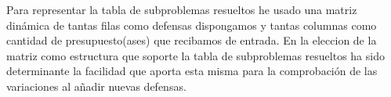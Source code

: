 Para representar la tabla de subproblemas resueltos he usado una matriz dinámica
de tantas filas como defensas dispongamos y tantas columnas como cantidad de
presupuesto(ases) que recibamos de entrada. En la eleccion de la matriz como
estructura que soporte la tabla de subproblemas resueltos ha sido determinante
la facilidad que aporta esta misma para la comprobación de las variaciones al
añadir nuevas defensas.
